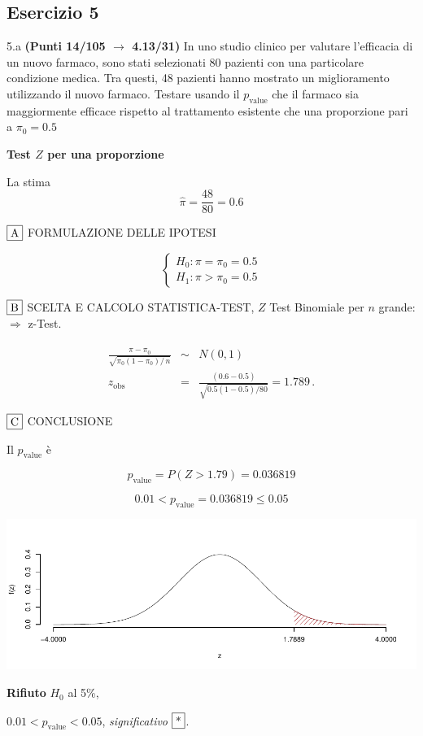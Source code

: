 \documentclass[
  11pt,
]{book}
\theoremstyle{mytheoremstyle}
\theoremstyle{mydefstyle}
\newenvironment{sol}
  {
  \begin{tcolorbox}[enhanced,breakable,arc=0.1mm,boxrule=1pt,colback=white,colframe=iblue,
  title=\bf \fontfamily{lmss}\selectfont \hspace{.5 cm} Soluzione,drop fuzzy shadow]

}{
\end{tcolorbox}
  }
\begin{document}
\subsection{Esercizio 5}\label{esercizio-5-30}

5.a \textbf{(Punti 14/105 \(\rightarrow\) 4.13/31)} In uno studio clinico per valutare l'efficacia di un nuovo farmaco, sono stati selezionati 80 pazienti con una particolare condizione medica. Tra questi, 48 pazienti hanno mostrato un miglioramento utilizzando il nuovo farmaco. Testare usando il \(p_\text{value}\) che il farmaco sia maggiormente efficace rispetto al trattamento esistente che una proporzione pari a \(\pi_0 = 0.5\)

\begin{sol}
\textbf{Test \(Z\) per una proporzione}

La stima
\[\hat\pi=\frac { 48 } { 80 }= 0.6  \]

\(\fbox{A}\) FORMULAZIONE DELLE IPOTESI

\[\begin{cases}
   H_0: \pi = \pi_0=0.5 \\
   H_1: \pi > \pi_0=0.5 
   \end{cases}\]

\(\fbox{B}\) SCELTA E CALCOLO STATISTICA-TEST, \(Z\)
Test Binomiale per \(n\) grande: \(\Rightarrow\) z-Test.

\begin{eqnarray*}
   \frac{\hat\pi - \pi_{0}} {\sqrt {\pi_0(1-\pi_0)/\,n}}&\sim&N(0,1)\\
   z_{\text{obs}}
   &=& \frac{ ( 0.6 -  0.5 )} {\sqrt{ 0.5 (1- 0.5 )/ 80 }}
   =   1.789 \,.
   \end{eqnarray*}

\(\fbox{C}\) CONCLUSIONE

Il \(p_{\text{value}}\) è

\[ p_{\text{value}} = P(Z>1.79)=0.036819 \]

\[
 0.01 < p_\text{value}= 0.036819 \leq 0.05 
\]

\begin{center}\includegraphics{Esami_passati_con_soluzioni_files/figure-latex/2023-95,-1} \end{center}

\textbf{Rifiuto} \(H_0\) al 5\%,

\(0.01<p_\text{value}<0.05\), \emph{significativo} \(\fbox{*}\).

\end{sol}
\end{document}
